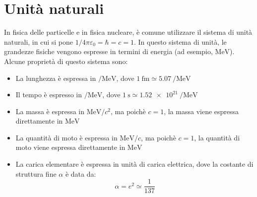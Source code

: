 \section{Unità naturali}
In fisica delle particelle e in fisica nucleare, è comune utilizzare il sistema di unità naturali, in cui si pone $1/4\pi\varepsilon_0 = \hbar = c = 1$. In questo sistema di unità, le grandezze fisiche vengono espresse in termini di energia (ad esempio, $\si{\mega\electronvolt}$). Alcune proprietà di questo sistema sono:
\begin{itemize}
    \item La lunghezza è espressa in $\si{\per\mega\electronvolt}$, dove $\qty{1}{\femto\meter} \simeq \qty{5.07}{\per\mega\electronvolt}$
    \item Il tempo è espresso in $\si{\per\mega\electronvolt}$, dove $\qty{1}{\second} \simeq \qty{1.52e21}{\per\mega\electronvolt}$
    \item La massa è espressa in $\si{\mega\electronvolt}/c^2$, ma poichè $c=1$, la massa viene espressa direttamente in $\si{\mega\electronvolt}$
    \item La quantità di moto è espressa in $\si{\mega\electronvolt}/c$, ma poichè $c=1$, la quantità di moto viene espressa direttamente in $\si{\mega\electronvolt}$
    \item La carica elementare è espressa in unità di carica elettrica, dove la costante di struttura fine $\alpha$ è data da:
    \begin{equation}
        \alpha = e^2 \simeq \dfrac{1}{137}
    \end{equation}
\end{itemize}
